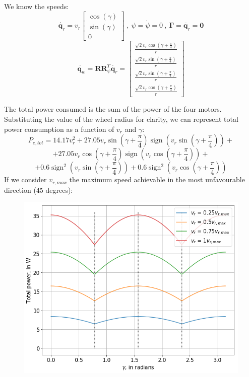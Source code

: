 \documentclass[12pt]{article}
\renewcommand{\vec}[1]{\bm{#1}}
\newcommand{\R}{\mathbb R}
\def\Torque{\vec \Gamma}
\def\R{\vec R}
\def\q{\vec q}
\begin{document}
We know the speeds:
$$\dot{\q_r} = v_r\left[\begin{matrix}\operatorname{cos}\left(\gamma\right)\\\operatorname{sin}\left(\gamma\right)\\0\end{matrix}\right]\ ,\ \psi = \dot{\psi} = 0\ ,\ \Torque = \ddot{\q_r} = \vec{0}$$
$$ \dot{\q_w} = \R\R_{\psi}^T\dot{\q_r} = \left[\begin{matrix}\frac{\sqrt{2} v_{r} \operatorname{cos}\left(\gamma + \frac{\pi}{4}\right)}{r}\\\frac{\sqrt{2} v_{r} \operatorname{sin}\left(\gamma + \frac{\pi}{4}\right)}{r}\\\frac{\sqrt{2} v_{r} \operatorname{sin}\left(\gamma + \frac{\pi}{4}\right)}{r}\\\frac{\sqrt{2} v_{r} \operatorname{cos}\left(\gamma + \frac{\pi}{4}\right)}{r}\end{matrix}\right]$$


The total power consumed is the sum of the power of the four motors. Substituting the value of the wheel radius for clarity, we can represent total power consumption as a function of $v_r$ and $\gamma$:
$$P_{e,tot} =14.17 v_{r}^{2} + 27.05 v_{r} \operatorname{sin}\left(\gamma + \frac{\pi}{4}\right) \operatorname{sign}\left(v_{r} \operatorname{sin}\left(\gamma + \frac{\pi}{4}\right)\right) +$$
$$+ 27.05 v_{r} \operatorname{cos}\left(\gamma + \frac{\pi}{4}\right) \operatorname{sign}\left(v_{r} \operatorname{cos}\left(\gamma + \frac{\pi}{4}\right)\right) +$$ 
$$+ 0.6 \operatorname{sign}^{2}\left(v_{r} \operatorname{sin}\left(\gamma + \frac{\pi}{4}\right)\right) + 0.6 \operatorname{sign}^{2}\left(v_{r} \operatorname{cos}\left(\gamma + \frac{\pi}{4}\right)\right)$$
If we consider $v_{r,max}$ the maximum speed achievable in the most unfavourable direction (45 degrees):
\begin{figure}[h]
	\centering
	\includegraphics[width=.5\linewidth]{total_power}
	\label{fig:total_power}
\end{figure}
\end{document}
